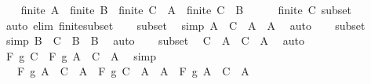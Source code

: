 \begin{isabellebody}
\ \ \isamarkupfalse%
\ {\isachardoublequoteopen}finite\ A{\isachardoublequoteclose}\ \ {\isachardoublequoteopen}finite\ B{\isachardoublequoteclose}\ \ {\isachardoublequoteopen}finite\ {\isacharparenleft}{\kern0pt}C\ {\isacharminus}{\kern0pt}\ A{\isacharparenright}{\kern0pt}{\isachardoublequoteclose}\ \ {\isachardoublequoteopen}finite\ {\isacharparenleft}{\kern0pt}C\ {\isacharminus}{\kern0pt}\ B{\isacharparenright}{\kern0pt}{\isachardoublequoteclose}\isanewline
\ \ \ \ \isamarkupfalse%
\ {\isacartoucheopen}finite\ C{\isacartoucheclose}\ subset\ \isamarkupfalse%
\ {\isacharparenleft}{\kern0pt}auto\ elim{\isacharcolon}{\kern0pt}\ finite{\isacharunderscore}{\kern0pt}subset{\isacharparenright}{\kern0pt}\isanewline
\ \ \isamarkupfalse%
\ subset\ \isamarkupfalse%
\ {\isacharbrackleft}{\kern0pt}simp{\isacharbrackright}{\kern0pt}{\isacharcolon}{\kern0pt}\ {\isachardoublequoteopen}A\ {\isacharminus}{\kern0pt}\ {\isacharparenleft}{\kern0pt}C\ {\isacharminus}{\kern0pt}\ A{\isacharparenright}{\kern0pt}\ {\isacharequal}{\kern0pt}\ A{\isachardoublequoteclose}\ \isamarkupfalse%
\ auto\isanewline
\ \ \isamarkupfalse%
\ subset\ \isamarkupfalse%
\ {\isacharbrackleft}{\kern0pt}simp{\isacharbrackright}{\kern0pt}{\isacharcolon}{\kern0pt}\ {\isachardoublequoteopen}B\ {\isacharminus}{\kern0pt}\ {\isacharparenleft}{\kern0pt}C\ {\isacharminus}{\kern0pt}\ B{\isacharparenright}{\kern0pt}\ {\isacharequal}{\kern0pt}\ B{\isachardoublequoteclose}\ \isamarkupfalse%
\ auto\isanewline
\ \ \isamarkupfalse%
\ subset\ \isamarkupfalse%
\ {\isachardoublequoteopen}C\ {\isacharequal}{\kern0pt}\ A\ {\isasymunion}\ {\isacharparenleft}{\kern0pt}C\ {\isacharminus}{\kern0pt}\ A{\isacharparenright}{\kern0pt}{\isachardoublequoteclose}\ \isamarkupfalse%
\ auto\isanewline
\ \ \isamarkupfalse%
\ \isamarkupfalse%
\ {\isachardoublequoteopen}F\ g\ C\ {\isacharequal}{\kern0pt}\ F\ g\ {\isacharparenleft}{\kern0pt}A\ {\isasymunion}\ {\isacharparenleft}{\kern0pt}C\ {\isacharminus}{\kern0pt}\ A{\isacharparenright}{\kern0pt}{\isacharparenright}{\kern0pt}{\isachardoublequoteclose}\ \isamarkupfalse%
\ simp\isanewline
\ \ \isamarkupfalse%
\ \isamarkupfalse%
\ {\isachardoublequoteopen}{\isasymdots}\ {\isacharequal}{\kern0pt}\ F\ g\ {\isacharparenleft}{\kern0pt}A\ {\isacharminus}{\kern0pt}\ {\isacharparenleft}{\kern0pt}C\ {\isacharminus}{\kern0pt}\ A{\isacharparenright}{\kern0pt}{\isacharparenright}{\kern0pt}\ \isactrlbold {\isacharasterisk}{\kern0pt}\ F\ g\ {\isacharparenleft}{\kern0pt}C\ {\isacharminus}{\kern0pt}\ A\ {\isacharminus}{\kern0pt}\ A{\isacharparenright}{\kern0pt}\ \isactrlbold {\isacharasterisk}{\kern0pt}\ F\ g\ {\isacharparenleft}{\kern0pt}A\ {\isasyminter}\ {\isacharparenleft}{\kern0pt}C\ {\isacharminus}{\kern0pt}\ A{\isacharparenright}{\kern0pt}{\isacharparenright}{\kern0pt}{\isachardoublequoteclose}\isanewline

\end{isabellebody}
